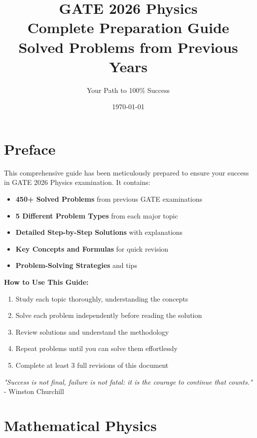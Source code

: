\documentclass[12pt,a4paper]{article}
\title{\Huge\textbf{GATE 2026 Physics}\\\vspace{0.5cm}\LARGE Complete Preparation Guide\\\vspace{0.3cm}\Large Solved Problems from Previous Years}
\author{\Large Your Path to 100\% Success}
\date{\today}
\begin{document}
\maketitle
\newpage

\tableofcontents
\newpage

\section*{Preface}

This comprehensive guide has been meticulously prepared to ensure your success in GATE 2026 Physics examination. It contains:

\begin{itemize}
    \item \textbf{450+ Solved Problems} from previous GATE examinations
    \item \textbf{5 Different Problem Types} from each major topic
    \item \textbf{Detailed Step-by-Step Solutions} with explanations
    \item \textbf{Key Concepts and Formulas} for quick revision
    \item \textbf{Problem-Solving Strategies} and tips
\end{itemize}

\textbf{How to Use This Guide:}
\begin{enumerate}
    \item Study each topic thoroughly, understanding the concepts
    \item Solve each problem independently before reading the solution
    \item Review solutions and understand the methodology
    \item Repeat problems until you can solve them effortlessly
    \item Complete at least 3 full revisions of this document
\end{enumerate}

\vspace{1cm}
\textit{"Success is not final, failure is not fatal: it is the courage to continue that counts."} - Winston Churchill

\newpage


\section{Mathematical Physics}
\end{document}
